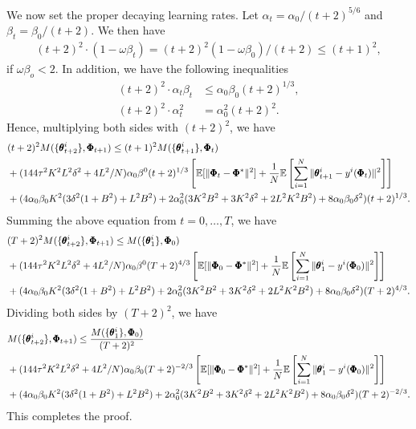 \documentclass{article} %
\theoremstyle{plain}
\theoremstyle{definition}
\theoremstyle{remark}
\begin{document}
{We now set the proper decaying learning rates. Let $\alpha_t=\alpha_0/(t+2)^{5/6}$ and $\beta_t=\beta_0/(t+2)$. We then have
\begin{align}
    (t+2)^2\cdot(1-\omega\beta_{t})=(t+2)^2(1-\omega\beta_0)/(t+2)\leq (t+1)^2,
\end{align}
if $\omega\beta_o<2$.
In addition, we have the following inequalities
\begin{align*}
    (t+2)^2\cdot\alpha_t\beta_t&\leq \alpha_0\beta_0(t+2)^{1/3},\\
    (t+2)^2\cdot\alpha_t^2&=\alpha_0^2(t+2)^2.
\end{align*}
Hence, multiplying both sides with $(t+2)^2$, we have
\begin{align*}
   & (t+2)^2M(\{\pmb{\theta}_{t+2}^i\}, \pmb{\Phi}_{t+1})\leq (t+1)^2M(\{\pmb{\theta}_{t+1}^i\}, \pmb{\Phi}_{t})\allowdisplaybreaks\\
    &+(144\tau^2K^2L^2\delta^2+4L^2/N)\alpha_0\beta^0(t+2)^{1/3}\left[\mathbb{E}[\|\pmb{\Phi}_t-\pmb{\Phi}^*\|^2]+\frac{1}{N}\mathbb{E}\left[\sum_{i=1}^N\|\pmb{\theta}^i_{t+1}-y^i(\pmb{\Phi}_t)\|^2\right]\right]\allowdisplaybreaks\\
    &+(4\alpha_0\beta_0K^2(3\delta^2(1+B^2)+L^2B^2)+2\alpha_{0}^2(3K^2B^2+3K^2\delta^2+2L^2K^2B^2)+8\alpha_{0}\beta_0\delta^2)(t+2)^{1/3}.
\end{align*}
Summing the above equation from $t=0, \ldots,T$, we have
\begin{align*}
  & (T+2)^2M(\{\pmb{\theta}_{t+2}^i\}, \pmb{\Phi}_{t+1})\leq M(\{\pmb{\theta}_{1}^i\}, \pmb{\Phi}_{0})\allowdisplaybreaks\\
    &+(144\tau^2K^2L^2\delta^2+4L^2/N)\alpha_0\beta^0(T+2)^{4/3}\left[\mathbb{E}[\|\pmb{\Phi}_0-\pmb{\Phi}^*\|^2]+\frac{1}{N}\mathbb{E}\left[\sum_{i=1}^N\|\pmb{\theta}^i_{1}-y^i(\pmb{\Phi}_0)\|^2\right]\right]\allowdisplaybreaks\\
    &+(4\alpha_0\beta_0K^2(3\delta^2(1+B^2)+L^2B^2)+2\alpha_{0}^2(3K^2B^2+3K^2\delta^2+2L^2K^2B^2)+8\alpha_{0}\beta_0\delta^2)(T+2)^{4/3}. 
\end{align*}
Dividing both sides by $(T+2)^2$, we have
\begin{align*}
    &M(\{\pmb{\theta}_{t+2}^i\}, \pmb{\Phi}_{t+1})\leq \frac{M(\{\pmb{\theta}_{1}^i\}, \pmb{\Phi}_{0})}{(T+2)^2}\allowdisplaybreaks\\
    &+(144\tau^2K^2L^2\delta^2+4L^2/N)\alpha_0\beta_0(T+2)^{-2/3}\left[\mathbb{E}[\|\pmb{\Phi}_0-\pmb{\Phi}^*\|^2]+\frac{1}{N}\mathbb{E}\left[\sum_{i=1}^N\|\pmb{\theta}^i_{1}-y^i(\pmb{\Phi}_0)\|^2\right]\right]\allowdisplaybreaks\\
    &+(4\alpha_0\beta_0K^2(3\delta^2(1+B^2)+L^2B^2)+2\alpha_{0}^2(3K^2B^2+3K^2\delta^2+2L^2K^2B^2)+8\alpha_{0}\beta_0\delta^2)(T+2)^{-2/3}. 
\end{align*}
This completes the proof. 


}
\end{document}
